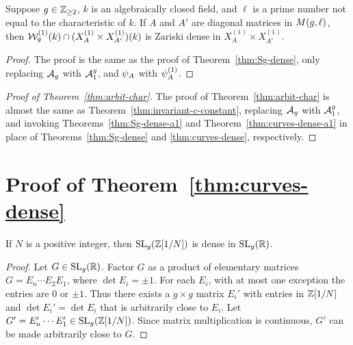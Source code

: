 \documentclass{amsart}
\begin{document}
\begin{theorem}\label{thm:Sg-dense-a1}
  Suppose $g\in\mathbb{Z}_{\ge 2}$, $k$ is an algebraically closed field, and $\ell$ is a prime number not equal to the characteristic of $k$. If $A$ and $A'$ are diagonal matrices in $M(g,\ell)$, then $\mathcal{W}_g^{(1)}(k) \cap (X^{(1)}_A \times X^{(1)}_{A'})(k)$ is Zariski dense in $X^{(1)}_A \times X^{(1)}_{A'}$.
\end{theorem}

\begin{proof}
  The proof is the same as the proof of Theorem~\ref{thm:Sg-dense}, only replacing $\mathcal{A}_g$ with $\mathcal{A}_1^g$, and $\psi_{A}$ with $\psi_{A}^{(1)}$.
\end{proof}

\begin{proof}[Proof of Theorem~\ref{thm:arbit-char}]
  The proof of Theorem~\ref{thm:arbit-char} is almost the same as Theorem~\ref{thm:invariant-c-constant}, replacing $\mathcal{A}_g$  with $\mathcal{A}_1^g$, and invoking Theorems~\ref{thm:Sg-dense-a1} and  Theorem~\ref{thm:curves-dense-a1} in place of Theorems~\ref{thm:Sg-dense} and \ref{thm:curves-dense}, respectively.
\end{proof}








\section{Proof of Theorem~\ref{thm:curves-dense}}
\label{sec:step-1}

\begin{lemma}\label{lem:sl-dense}
  If $N$ is a positive integer, then $\operatorname{SL}_g(\mathbb{Z}[1/N])$ is dense in $\operatorname{SL}_g(\mathbb{R})$.
\end{lemma}
\begin{proof}
  Let $G \in \operatorname{SL}_g(\mathbb{R})$. Factor $G$ as a product of elementary matrices $G = E_n \cdots E_2 E_1$, where $\det E_i = \pm 1$. For each $E_i$, with at most one exception the entries are $0$ or $\pm 1$. Thus there exists a $g \times g$ matrix $E_i'$ with entries in $\mathbb{Z}[1/N]$ and $\det E_i' = \det E_i$ that is arbitrarily close to $E_i$. Let $G' = E_n' \cdots E_1' \in \operatorname{SL}_g(\mathbb{Z}[1/N])$. Since matrix multiplication is continuous, $G'$ can be made arbitrarily close to $G$.
\end{proof}
\end{document}
